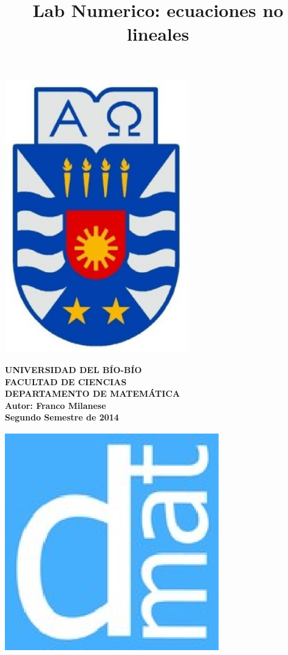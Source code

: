 \documentclass[12pt,letterpaper]{article}
\begin{document}
\title{Lab Numerico: ecuaciones no lineales}
{\begin{minipage}{2cm}
\hspace*{1cm}\includegraphics[width=0.6\textwidth]{escubo-ubb.eps}
\end{minipage}
\begin{minipage}{12cm}
\small
{\bf \rm
{\hspace*{3.1cm} {\footnotesize UNIVERSIDAD DEL B\'IO-B\'IO} \\
 \hspace*{3.7cm} {\scriptsize FACULTAD DE CIENCIAS}  \\
  \hspace*{2.9cm} {\scriptsize DEPARTAMENTO DE MATEM\'ATICA}  \\
\hspace*{3.75cm} {\scriptsize Autor: Franco Milanese}\\
\hspace*{3.75cm} {\scriptsize Segundo Semestre de 2014}}}
\end{minipage}}
{\begin{minipage}{2cm}
\hspace*{-0.5cm}\vspace*{-0.05cm}\includegraphics[width=0.7\textwidth]{escudo-dmat.eps}
\end{minipage}}
\end{document}
